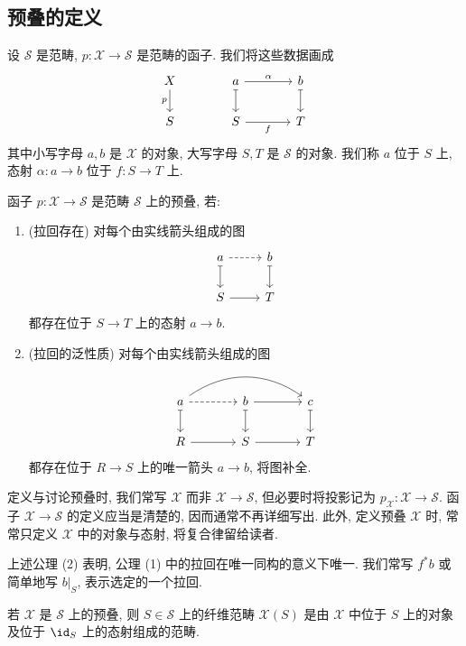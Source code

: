 \subsection{预叠的定义}\label{src:3.4.1-subsection}
设 $\mathcal S$ 是范畴, $p:\mathcal X\to\mathcal S$ 是范畴的函子. 我们将这些数据画成
\[
\begin{tikzcd}[column sep=large]
\mathcal X\arrow[d,"p"']&a\arrow[r,"\alpha"]\arrow[d,mapsto]&b\arrow[d,mapsto]\\
\mathcal S&S\arrow[r,"f"']&T
\end{tikzcd}
\]
其中小写字母 $a,b$ 是 $\mathcal X$ 的对象, 大写字母 $S,T$ 是 $\mathcal S$ 的对象. 我们称 $a$ 位于 $S$ 上, 态射 $\alpha:a\to b$ 位于 $f:S\to T$ 上.
\begin{definition}[预叠]\label{src:3.4.1}
函子 $p:\mathcal X\to\mathcal S$ 是范畴 $\mathcal S$ 上的预叠, 若:
\begin{enumerate}[(1)]
\item (拉回存在) 对每个由实线箭头组成的图
\[
\begin{tikzcd}
a\arrow[r,dashed]\arrow[d,mapsto]&b\arrow[d,mapsto]\\
S\arrow[r]&T
\end{tikzcd}
\]
都存在位于 $S\to T$ 上的态射 $a\to b.
$
\item (拉回的泛性质) 对每个由实线箭头组成的图
\[
\begin{tikzcd}[column sep=large]
a\arrow[r,dashed]\arrow[rr,bend left=35]\arrow[d,mapsto]&
b\arrow[r]\arrow[d,mapsto]&c\arrow[d,mapsto]\\
R\arrow[r]&S\arrow[r]&T
\end{tikzcd}
\]
都存在位于 $R\to S$ 上的唯一箭头 $a\to b$, 将图补全.
\end{enumerate}
\end{definition}
\begin{caution}\label{src:3.4.2}
定义与讨论预叠时, 我们常写 $\mathcal X$ 而非 $\mathcal X\to\mathcal S$, 但必要时将投影记为 $p_{\mathcal X}:\mathcal X\to\mathcal S$. 函子 $\mathcal X\to\mathcal S$ 的定义应当是清楚的, 因而通常不再详细写出. 此外, 定义预叠 $\mathcal X$ 时, 常常只定义 $\mathcal X$ 中的对象与态射, 将复合律留给读者.
\end{caution}
\begin{remark}\label{src:3.4.3}
上述公理 (2) 表明, 公理 (1) 中的拉回在唯一同构的意义下唯一. 我们常写 $f^*b$ 或简单地写 $b|_S$, 表示选定的一个拉回.
\end{remark}
\begin{definition}[纤维范畴]\label{src:3.4.4}
若 $\mathcal X$ 是 $\mathcal S$ 上的预叠, 则 $S\in\mathcal S$ 上的纤维范畴 $\mathcal X(S)$ 是由 $\mathcal X$ 中位于 $S$ 上的对象及位于 $\id_S$ 上的态射组成的范畴.
\end{definition}
